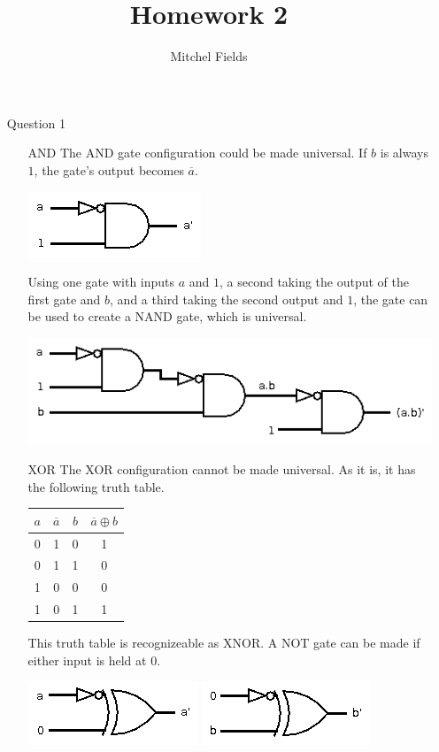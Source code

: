 \documentclass{article}
\title{Homework 2}
\author{Mitchel Fields}
\begin{document}
\maketitle
\begin{itemize}

	\item [Question 1]\hspace{0pt}\\
	\begin{itemize}
		\item [AND] The AND gate configuration could be made universal. If $b$ is always $1$, the gate's output becomes $\overline{a}$.

		\includegraphics[scale=0.7]{hw2-1a}

		Using one gate with inputs $a$ and $1$, a second taking the output of the first gate and $b$, and a third taking the second output and $1$, the gate can be used to create a NAND gate, which is universal.

		\includegraphics[scale=0.7]{hw2-1a2}

		\item[XOR] The XOR configuration cannot be made universal. As it is, it has the following truth table.

		\begin{tabular}{ c c c | c}
		$a$ & $\overline{a}$ & $b$ & $\overline{a} \oplus b$\\ \hline
		0 & 1 & 0 & 1\\
		0 & 1 & 1 & 0\\
		1 & 0 & 0 & 0\\
		1 & 0 & 1 & 1
		\end{tabular}

		This truth table is recognizeable as XNOR. A NOT gate can be made if either input is held at $0$.

		\includegraphics[scale=0.7]{hw2-1b} \includegraphics[scale=0.7]{hw2-1b2}


\end{itemize}
\end{itemize}
\end{document}
